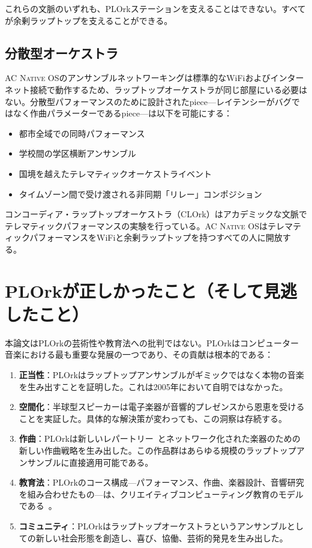\documentclass[10pt,letterpaper,twocolumn]{article}
\newcommand{\acos}{\textsc{AC Native OS}}
\begin{document}
これらの文脈のいずれも、PLOrkステーションを支えることはできない。すべてが余剰ラップトップを支えることができる。

\subsection{分散型オーケストラ}

\acos{}のアンサンブルネットワーキングは標準的なWiFiおよびインターネット接続で動作するため、ラップトップオーケストラが同じ部屋にいる必要はない。分散型パフォーマンスのために設計されたpiece---レイテンシーがバグではなく作曲パラメーターであるpiece---は以下を可能にする：

\begin{itemize}
  \item 都市全域での同時パフォーマンス
  \item 学校間の学区横断アンサンブル
  \item 国境を越えたテレマティックオーケストライベント
  \item タイムゾーン間で受け渡される非同期「リレー」コンポジション
\end{itemize}

コンコーディア・ラップトップオーケストラ（CLOrk）はアカデミックな文脈でテレマティックパフォーマンスの実験を行っている。\acos{}はテレマティックパフォーマンスをWiFiと余剰ラップトップを持つすべての人に開放する。


\section{PLOrkが正しかったこと（そして見逃したこと）}
\label{sec:lessons}

本論文はPLOrkの芸術性や教育法への批判ではない。PLOrkはコンピューター音楽における最も重要な発展の一つであり、その貢献は根本的である：

\begin{enumerate}
  \item \textbf{正当性}：PLOrkはラップトップアンサンブルがギミックではなく本物の音楽を生み出すことを証明した。これは2005年において自明ではなかった。
  \item \textbf{空間化}：半球型スピーカーは電子楽器が音響的プレゼンスから恩恵を受けることを実証した。具体的な解決策が変わっても、この洞察は存続する。
  \item \textbf{作曲}：PLOrkは新しいレパートリー~\citep{smallwood2008composing}とネットワーク化された楽器のための新しい作曲戦略を生み出した。この作品群はあらゆる規模のラップトップアンサンブルに直接適用可能である。
  \item \textbf{教育法}：PLOrkのコース構成---パフォーマンス、作曲、楽器設計、音響研究を組み合わせたもの---は、クリエイティブコンピューティング教育のモデルである~\citep{trueman2007why}。
  \item \textbf{コミュニティ}：PLOrkはラップトップオーケストラというアンサンブルとしての新しい社会形態を創造し、喜び、協働、芸術的発見を生み出した。
\end{enumerate}
\end{document}
